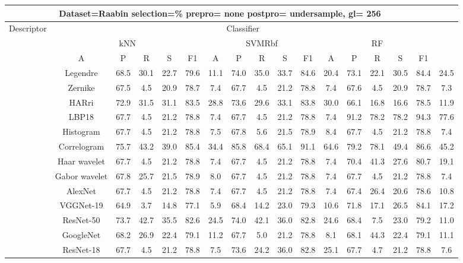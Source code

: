 \documentclass[12pt,italian]{article}
\begin{document}
\begin{tiny}
\begin{longtable}{lcccccccccccccccc}
\toprule
\multicolumn{16}{c}{Dataset=Raabin selection=\% prepro= none postpro= undersample, gl= 256} \\ 
\toprule
Descriptor & \multicolumn{15}{c}{Classifier} \\ 
& \multicolumn{5}{c}{kNN} & \multicolumn{5}{c}{SVMRbf} & \multicolumn{5}{c}{RF} \\ 
& A & P & R & S & F1 & A & P & R & S & F1 & A & P & R & S & F1 \\ 
\midrule
& Legendre & 68.5 & 30.1 & 22.7 & 79.6 & 11.1 & 74.0 & 35.0 & 33.7 & 84.6 & 20.4 & 73.1 & 22.1 & 30.5 & 84.4 & 24.5 \\ 
& Zernike & 67.5 &  4.5 & 20.9 & 78.7 &  7.4 & 67.7 &  4.5 & 21.2 & 78.8 &  7.4 & 67.6 &  4.5 & 20.9 & 78.7 &  7.3 \\ 
& HARri & 72.9 & 31.5 & 31.1 & 83.5 & 28.8 & 73.6 & 29.6 & 33.1 & 83.8 & 30.0 & 66.1 & 16.8 & 16.6 & 78.5 & 11.9 \\ 
& LBP18 & 67.7 &  4.5 & 21.2 & 78.8 &  7.4 & 67.7 &  4.5 & 21.2 & 78.8 &  7.4 & 91.2 & 78.2 & 78.2 & 94.3 & 77.6 \\ 
& Histogram & 67.7 &  4.5 & 21.2 & 78.8 &  7.5 & 67.8 &  5.6 & 21.5 & 78.9 &  8.4 & 67.7 &  4.5 & 21.2 & 78.8 &  7.4 \\ 
& Correlogram & 75.7 & 43.2 & 39.0 & 85.4 & 34.4 & 85.8 & 68.4 & 65.1 & 91.1 & 64.6 & 79.2 & 78.1 & 49.4 & 86.6 & 45.2 \\ 
& Haar wavelet & 67.7 &  4.5 & 21.2 & 78.8 &  7.4 & 67.7 &  4.5 & 21.2 & 78.8 &  7.4 & 70.4 & 41.3 & 27.6 & 80.7 & 19.1 \\ 
& Gabor wavelet & 67.8 & 25.7 & 21.5 & 78.9 &  8.0 & 67.7 &  4.5 & 21.2 & 78.8 &  7.4 & 67.7 &  4.5 & 21.2 & 78.8 &  7.4 \\ 
& AlexNet & 67.7 &  4.5 & 21.2 & 78.8 &  7.4 & 67.7 &  4.5 & 21.2 & 78.8 &  7.4 & 67.4 & 26.4 & 20.6 & 78.6 & 10.8 \\ 
& VGGNet-19 & 64.9 &  3.7 & 14.8 & 77.1 &  5.9 & 68.4 & 14.2 & 23.0 & 79.3 & 10.6 & 71.8 & 17.1 & 26.5 & 84.1 & 17.2 \\ 
& ResNet-50 & 73.7 & 42.7 & 35.5 & 82.6 & 24.5 & 74.0 & 42.1 & 36.0 & 82.8 & 24.6 & 68.4 &  7.5 & 23.0 & 79.2 & 11.0 \\ 
& GoogleNet & 68.2 & 26.9 & 22.4 & 79.1 & 11.2 & 67.7 &  5.0 & 21.2 & 78.8 &  8.1 & 68.1 & 44.3 & 22.4 & 79.1 & 11.1 \\ 
& ResNet-18 & 67.7 &  4.5 & 21.2 & 78.8 &  7.5 & 73.6 & 24.2 & 36.0 & 82.8 & 25.1 & 67.7 &  4.7 & 21.2 & 78.8 &  7.6 \\ 

\end{longtable}
\end{tiny}
\end{document}
